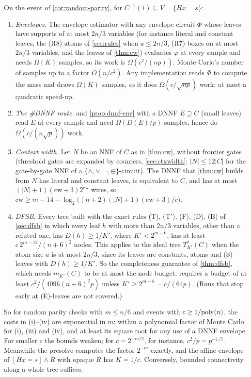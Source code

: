 \begin{corollary}\label{cor:barrier-methods}
On the event of \cref{cor:random-parity}, for $C^{-1}(1)\subseteq V=\{Hx=s\}$:
\begin{enumerate}[label=(\roman*)]
\item \emph{Envelopes.} The envelope estimator with any envelope circuit $\Phi$
whose leaves have supports of at most $2n/3$ variables (for instance literal and
constant leaves, the (R8) atoms of \cref{sec:rules} when $a\le2n/3$, (R7) boxes on at
most $2n/3$ variables, and the leaves of \cref{thm:cw}) evaluates $\varphi$ at every sample and needs $\Omega(K)$ samples, so its work is
$\Omega(c^2/(np))$: Monte Carlo's number of samples up to a factor $O(n/c^2)$. Any
implementation reads $\Phi$ to compute the mass and draws $\Omega(K)$ samples, so it
does $\Omega(c/\sqrt{np})$ work: at most a quadratic speed-up.
\item \emph{The \#DNNF route.}  and \cref{prop:dnnf-env} with a DNNF
$E\supseteq C$ (small leaves) read $E$ at every sample and need $\Omega(D(E)/p)$
samples, hence do $\Omega(c/(n\sqrt p))$ work.
\item \emph{Context width.} Let $N$ be an NNF of $C$ as in \cref{thm:cw}, without
frontier gates (threshold gates are expanded by counters, \cref{sec:ctxwidth};
$|N|\le12|C|$ for the gate-by-gate NNF of a $\{\wedge,\vee,\neg,\oplus\}$-circuit). The DNNF that \cref{thm:cw} builds from $N$
has literal and constant leaves, is equivalent to $C$, and has at most
$(|N|+1)(\mathrm{cw}+3)2^{\mathrm{cw}}$ wires, so
$\mathrm{cw}\ge m-14-\log_2\big((n+2)(|N|+1)(\mathrm{cw}+3)/c\big)$.
\item \emph{DFSB.} Every tree built with the exact rules (T), (T$'$), (F), (D), (B) of
\cref{sec:dfsb} in which every leaf $h$ with more than $2n/3$ variables, other than a
refuted one, has $D(h)\ge1/K'$, where $K'<2^{m-6}$, has at least $c\,2^{m-12}/(n+6)^2$ nodes. This
applies to the ideal tree $T^*_{K'}(C)$ when the atom size $a$ is at most $2n/3$, since
its leaves are constants, atoms and (S)-leaves with $D(h)\ge1/K'$. So the completeness
guarantee of \cref{thm:dfsb}, which needs $m_{K'}(C)$ to be at most the node budget,
requires a budget of at least $c^2/(4096(n+6)^2p)$ unless $K'\ge2^{m-6}=c/(64p)$. (Runs
that stop early at (E)-leaves are not covered.)
\end{enumerate}
\end{corollary}

So for random parity checks with $m\le n/6$ and events with $c\ge1/\mathrm{poly}(n)$, the
costs in (i)--(iv) are exponential in $m$: within a polynomial factor of Monte Carlo
for (i), (iii) and (iv), and at least its square root for any use of a DNNF envelope.
For smaller $c$ the bounds weaken; for $c=2^{-m/2}$, for instance, $c^2/p=p^{-1/3}$.
Meanwhile
the presolve computes the factor $2^{-m}$ exactly, and the affine envelope of
$[Hx=s]\wedge R$ with opaque $R$ has $K=1/c$. Conversely, bounded connectivity along a
whole tree suffices.

